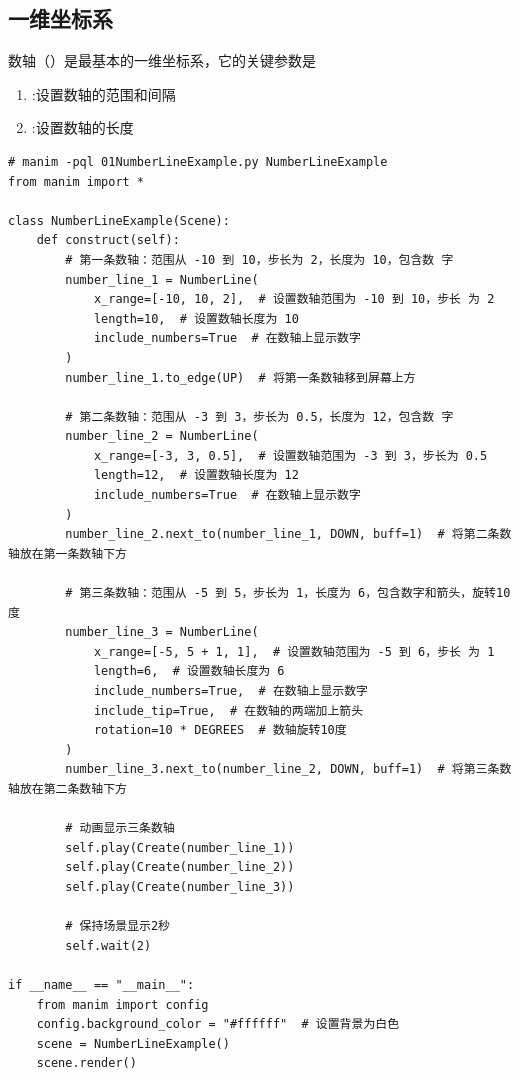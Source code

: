 \subsection{一维坐标系}
\label{subsec:Manim基本图形-一维坐标系}
数轴（）是最基本的一维坐标系，它的关键参数是
\begin{enumerate}[label=\arabic*)]
    \item {}:设置数轴的范围和间隔
    \item {}:设置数轴的长度
\end{enumerate}
\begin{lstlisting}[style=pythonstyle]
# manim -pql 01NumberLineExample.py NumberLineExample
from manim import *

class NumberLineExample(Scene):
    def construct(self):
        # 第一条数轴：范围从 -10 到 10，步长为 2，长度为 10，包含数 字
        number_line_1 = NumberLine(
            x_range=[-10, 10, 2],  # 设置数轴范围为 -10 到 10，步长 为 2
            length=10,  # 设置数轴长度为 10
            include_numbers=True  # 在数轴上显示数字
        )
        number_line_1.to_edge(UP)  # 将第一条数轴移到屏幕上方

        # 第二条数轴：范围从 -3 到 3，步长为 0.5，长度为 12，包含数 字
        number_line_2 = NumberLine(
            x_range=[-3, 3, 0.5],  # 设置数轴范围为 -3 到 3，步长为 0.5
            length=12,  # 设置数轴长度为 12
            include_numbers=True  # 在数轴上显示数字
        )
        number_line_2.next_to(number_line_1, DOWN, buff=1)  # 将第二条数轴放在第一条数轴下方

        # 第三条数轴：范围从 -5 到 5，步长为 1，长度为 6，包含数字和箭头，旋转10度
        number_line_3 = NumberLine(
            x_range=[-5, 5 + 1, 1],  # 设置数轴范围为 -5 到 6，步长 为 1
            length=6,  # 设置数轴长度为 6
            include_numbers=True,  # 在数轴上显示数字
            include_tip=True,  # 在数轴的两端加上箭头
            rotation=10 * DEGREES  # 数轴旋转10度
        )
        number_line_3.next_to(number_line_2, DOWN, buff=1)  # 将第三条数轴放在第二条数轴下方

        # 动画显示三条数轴
        self.play(Create(number_line_1))
        self.play(Create(number_line_2))
        self.play(Create(number_line_3))

        # 保持场景显示2秒
        self.wait(2)

if __name__ == "__main__":
    from manim import config
    config.background_color = "#ffffff"  # 设置背景为白色
    scene = NumberLineExample()
    scene.render()
\end{lstlisting}           

